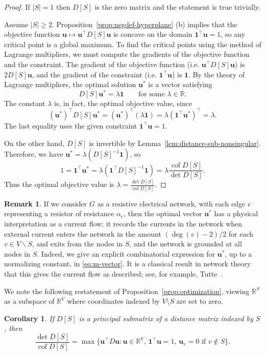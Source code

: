 \documentclass[12pt]{amsart}
\newtheorem{cor}[thm]{Corollary}
\theoremstyle{definition}
\newtheorem{rmk}[thm]{Remark}
\newcommand{\RR}{\mathbb{R}}
\newcommand{\bone}{\mathbf{1}}
\newcommand{\boldu}{\mathbf{u}}
\newcommand{\tr}{\intercal}
\DeclareMathOperator{\cof}{cof}
\newcommand\farbod[1]{\footnote{[\textcolor{orange}{(Farbod)} \textcolor{blue}{#1}]}}
\begin{document}
\begin{proof}
If $|S| = 1$ then $D[S]$ is the zero matrix and the statement is true trivially.

Assume $|S| \geq 2$.
Proposition~\ref{prop:negdef-hyperplane} (b) implies that 
the objective function $\boldu \mapsto \boldu^\tr D[S]\boldu$ is concave on the domain $\bone^\tr \boldu = 1$, so any critical point is a global maximum.
To find the critical points using the method of Lagrange multipliers, we must compute the gradients of the objective function and the constraint.
The gradient of the objective function (i.e. $\boldu^\tr D[S] \boldu$) is $2 D[S] \boldu$, 
and the gradient of the constraint (i.e. $\bone^\tr \boldu$) is $\bone$.
By the theory of Lagrange multipliers, the optimal solution $\boldu^*$ is a vector satisfying
\[
	D[S] \boldu^* = \lambda \bone \qquad\text{for some }\lambda \in \RR.
\]
The constant $\lambda$ is, in fact, the optimal objective value, since
\[
	(\boldu^*)^\tr D[S] \boldu^* = (\boldu^*)^\tr (\lambda \bone) = \lambda (\bone^\tr \boldu^*)^\tr = \lambda.
\]
The last equality uses the given constraint $\bone^\tr \boldu = 1$.

On the other hand,
 $D[S]$ is invertible by Lemma~\ref{lem:distance-sub-nonsingular}. Therefore, we have $ \boldu^* = \lambda (D[S]^{-1} \bone) $, so
\[
	1 = \bone^\tr \boldu^* = \lambda (\bone^\tr D[S]^{-1} \bone)
	= \lambda \frac{\cof D[S]}{\det D[S]}.
\]
Thus the optimal objective value is
$\displaystyle
	\lambda = \frac{\det D[S]}{\cof D[S]} .
$
\end{proof}

\begin{rmk}
If we consider $G$ as a resistive electrical network, with each edge $e$ representing a resistor of resistance $\alpha_e$,
then the optimal vector $\boldu^*$
has a physical interpretation as a current flow: 
it records the currents in the network when external current enters the network in the amount $(\deg(v) - 2)/2$ for each $v \in V \backslash S$,
and exits from the nodes in $S$, and the network is grounded at all nodes in $S$.
Indeed, we give an explicit combinatorial expression for $\boldu^*$, up to a normalizing constant, in \eqref{eq:m-vector}. It is a classical result in network theory that this gives the current flow as described; see, for example, Tutte~\cite[Section VI.6]{tutte}.
\end{rmk}

We note the following restatement of Proposition~\ref{prop:optimization}, viewing $\RR^S$ as a subspace of $\RR^V$ 
where coordinates indexed by $V \setminus S$ are set to zero.
\begin{cor}
\label{cor:optimization}
If $D[S]$ is a principal submatrix of a distance matrix indexed by $S$, then 
\[
	\frac{\det D[S]}{\cof D[S]} = \max \{\boldu^\tr D \boldu \colon \boldu \in \RR^V,\, \bone^\tr \boldu = 1,\, \boldu_v = 0 \text{ if } v \not\in S \}.
\]
\end{cor}
\end{document}
